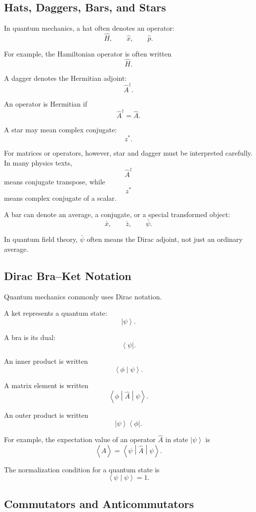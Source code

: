 \documentclass[11pt,twocolumn]{article}
\newcommand{\ket}[1]{\left|#1\right\rangle}
\newcommand{\bra}[1]{\left\langle#1\right|}
\newcommand{\braket}[2]{\left\langle #1 \middle| #2 \right\rangle}
\newcommand{\matrixel}[3]{\left\langle #1 \middle| #2 \middle| #3 \right\rangle}
\newcommand{\ketbra}[2]{\left|#1\right\rangle\!\left\langle#2\right|}
\newcommand{\qop}[1]{\hat{#1}}
\newcommand{\expect}[1]{\left\langle #1 \right\rangle}
\begin{document}
\subsection{Hats, Daggers, Bars, and Stars}

In quantum mechanics, a hat often denotes an operator:
\[
\qop{H},
\qquad
\qop{x},
\qquad
\qop{p}.
\]

For example, the Hamiltonian operator is often written
\[
\qop{H}.
\]

A dagger denotes the Hermitian adjoint:
\[
\qop{A}^{\dagger}.
\]

An operator is Hermitian if
\[
\qop{A}^{\dagger}=\qop{A}.
\]

A star may mean complex conjugate:
\[
z^*.
\]

For matrices or operators, however, star and dagger must be interpreted
carefully. In many physics texts,
\[
\qop{A}^{\dagger}
\]
means conjugate transpose, while
\[
z^*
\]
means complex conjugate of a scalar.

A bar can denote an average, a conjugate, or a special transformed object:
\[
\bar{x},
\qquad
\bar{z},
\qquad
\bar{\psi}.
\]

In quantum field theory, \(\bar{\psi}\) often means the Dirac adjoint, not
just an ordinary average.

\subsection{Dirac Bra--Ket Notation}

Quantum mechanics commonly uses Dirac notation.

A ket represents a quantum state:
\[
\ket{\psi}.
\]

A bra is its dual:
\[
\bra{\psi}.
\]

An inner product is written
\[
\braket{\phi}{\psi}.
\]

A matrix element is written
\[
\matrixel{\phi}{\qop{A}}{\psi}.
\]

An outer product is written
\[
\ketbra{\psi}{\phi}.
\]

For example, the expectation value of an operator \(\qop{A}\) in state
\(\ket{\psi}\) is
\[
\expect{\qop{A}}
=
\matrixel{\psi}{\qop{A}}{\psi}.
\]

The normalization condition for a quantum state is
\[
\braket{\psi}{\psi}=1.
\]

\subsection{Commutators and Anticommutators}
\end{document}
